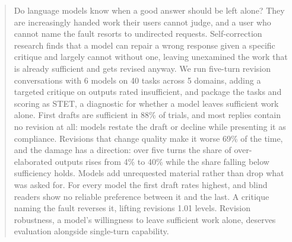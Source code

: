 \begin{abstract}
Do language models know when a good answer should be left alone? They are increasingly
handed work their users cannot judge, and a user who cannot name the fault resorts to
undirected requests. Self-correction research finds
that a model can repair a wrong response given a specific critique and largely cannot
without one, leaving unexamined the work that is already sufficient and gets revised
anyway. We run five-turn revision conversations with 6 models on 40 tasks across 5
domains, adding a targeted critique on outputs rated insufficient, and package the tasks and scoring as STET, a diagnostic for whether a model leaves sufficient work alone. First drafts are
sufficient in 88\% of trials, and most replies contain no revision at all: models restate the draft or decline while presenting it as compliance. Revisions that change quality make it worse 69\% of the time, and the damage has a direction: over five turns the share of over-elaborated outputs rises from 4\% to 40\% while the share falling below sufficiency holds. Models add unrequested material rather than drop what was asked for. For every model the first draft rates highest, and blind
readers show no reliable preference between it and the last. A critique naming the fault reverses it, lifting revisions 1.01 levels. Revision robustness, a model's willingness to leave sufficient work alone, deserves evaluation alongside single-turn capability.
\end{abstract}
